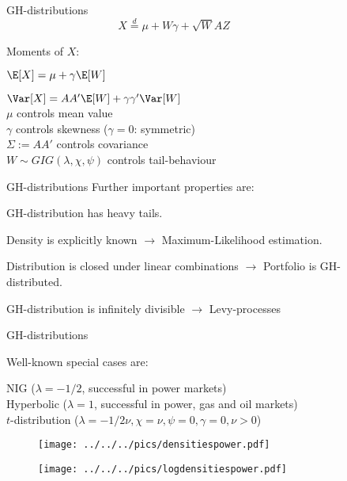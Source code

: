 \begin{figure}[htp]
GH-distributions %
$$
X\stackrel{d}{=}\mu+W\gamma+\sqrt{W}AZ
$$


Moments of $X$: 

$\E[X]=\mu+\gamma\E[W]$ 

$\Var[X]=AA'\E[W]+\gamma\gamma'\Var[W]$\\[-1.5cm] 

$\mu$ controls mean value\\[-1.5cm] 

$\gamma$ controls skewness ($\gamma=0$: symmetric)\\[-1.5cm] 

$\Sigma:=AA'$ controls covariance\\[-1.5cm] 

$W\sim GIG(\lambda,\chi,\psi)$ controls tail-behaviour 

GH-distributions %
Further important properties are: %


GH-distribution has heavy tails. 

Density is explicitly known $\rightarrow$ Maximum-Likelihood estimation. 

Distribution is closed under linear combinations $\rightarrow$ Portfolio
is GH-distributed. 

GH-distribution is infinitely divisible $\rightarrow$ Levy-processes 

GH-distributions

Well-known special cases are: 

NIG ($\lambda=-1/2$, successful in power markets)\\[-1.5cm] 

Hyperbolic ($\lambda=1$, successful in power, gas and oil markets)\\[-1.5cm] 

$t$-distribution ($\lambda=-1/2\nu,\chi=\nu,\psi=0,\gamma=0,\nu>0$) 



\begin{center}
\begin{figure}
\texttt{[image: ../../../pics/densitiespower.pdf]}
\end{figure}

\par\end{center}



\begin{center}
\begin{figure}
\texttt{[image: ../../../pics/logdensitiespower.pdf]} 
\end{figure}


\end{center}
\end{figure}
